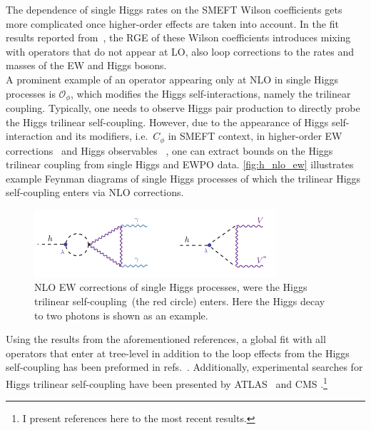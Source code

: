 The dependence of single Higgs rates on the SMEFT Wilson coefficients gets more complicated once higher-order effects are taken into account. In the fit results reported from~\cite{Dawson:2020oco}, the RGE of these Wilson coefficients introduces mixing with operators that do not appear at LO, also loop corrections to the rates and masses of the EW and Higgs bosons. \\A prominent example of an operator appearing only at NLO in single Higgs processes is $\mathcal O_\phi$, which modifies the Higgs self-interactions, namely the trilinear coupling. 
Typically, one needs to observe Higgs pair production to directly probe the Higgs trilinear self-coupling. However, due to the appearance of Higgs self-interaction and its modifiers, i.e.~$C_\phi$ in SMEFT context, in higher-order EW corrections~\cite{Degrassi:2014sxa,Kribs:2017znd} and Higgs observables~ \cite{McCullough:2013rea, Gorbahn:2016uoy, Degrassi:2016wml, Bizon:2016wgr, Maltoni:2017ims, Degrassi:2019yix, Degrassi:2021uik, Haisch:2021hvy}, one can extract bounds on the Higgs trilinear coupling from single Higgs and EWPO data. \autoref{fig:h_nlo_ew} illustrates example Feynman diagrams of single Higgs processes of which the trilinear Higgs self-coupling enters via NLO corrections.
\begin{figure}[htpb!]
	\begin{center}
		\includegraphics[width=0.8\textwidth]{figures/htoaa_nlo_ew}
		\caption{NLO EW corrections of single Higgs processes,  were the Higgs trilinear self-coupling~(the red circle) enters. Here the Higgs decay to two photons is shown as an example. \label{fig:h_nlo_ew} }
	\end{center}
\end{figure}
Using the results from the aforementioned references, a global fit with all operators that enter at tree-level in addition to the loop effects from the Higgs self-coupling has been preformed in refs.~\cite{DiVita:2017eyz,Dawson:2020oco}. Additionally, experimental searches for Higgs trilinear self-coupling have been presented by ATLAS~\cite{ATLAS:2019pbo} and CMS \cite{CMS:2020gsy}.\footnote{I present references here to the most recent results.} 
